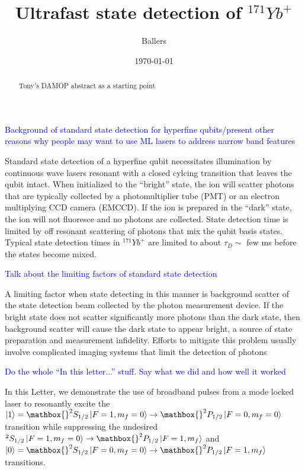 \documentclass[preprint, superscriptaddress,amsmath,amssymb,aps,prl]{revtex4-1}
\newcommand{\add}[1]{\textcolor{blue}{#1}}
\begin{document}
 
\title{Ultrafast state detection of $^{171}Yb^+$}

\author{Ballers}


\date{\today}

\begin{abstract}
  Tony's DAMOP abstract as a starting point
\end{abstract}

\maketitle

\add{Background of standard state detection for hyperfine qubits/present other reasons why people may want to use ML lasers to address narrow band features}

Standard state detection of a hyperfine qubit necessitates illumination by continuous wave lasers resonant with a closed cylcing transition that leaves the qubit intact. When initialized to the ``bright'' state, the ion will scatter photons that are typically collected by a photomultiplier tube (PMT) or an electron multiplying CCD camera (EMCCD). If the ion is prepared in the ``dark'' state, the ion will not fluoresce and no photons are collected. State detection time is limited by off resonant scattering of photons that mix the qubit basis states. Typical state detection times in $^{171}Yb^+$ are limited to about $\tau_{D} \sim$ few ms before the states become mixed.

\add{Talk about the limiting factors of standard state detection}

A limiting factor when state detecting in this manner is background scatter of the state detection beam collected by the photon measurement device. If the bright state does not scatter significantly more photons than the dark state, then background scatter will cause the dark state to appear bright, a source of state preparation and measurement infidelity. Efforts to mitigate this problem usually involve complicated imaging systems that limit the detection of photons 

\add{Do the whole ``In this letter...'' stuff. Say what we did and how well it worked}

In this Letter, we demonstrate the use of broadband pulses from a mode locked laser to resonantly excite the $\ket{1} = \mathbox{}^2S_{1/2}\ket{F = 1, m_f = 0} \rightarrow \mathbox{}^2P_{1/2}\ket{F = 0, m_f = 0}$ transition while suppressing the undesired $^2S_{1/2}\ket{F = 1, m_f = 0} \rightarrow \mathbox{}^2P_{1/2}\ket{F = 1, m_f}$ and $\ket{0} = \mathbox{}^2S_{1/2}\ket{F = 0, m_f = 0} \rightarrow \mathbox{}^2P_{1/2}\ket{F = 1, m_f}$ transitions.
\end{document}
